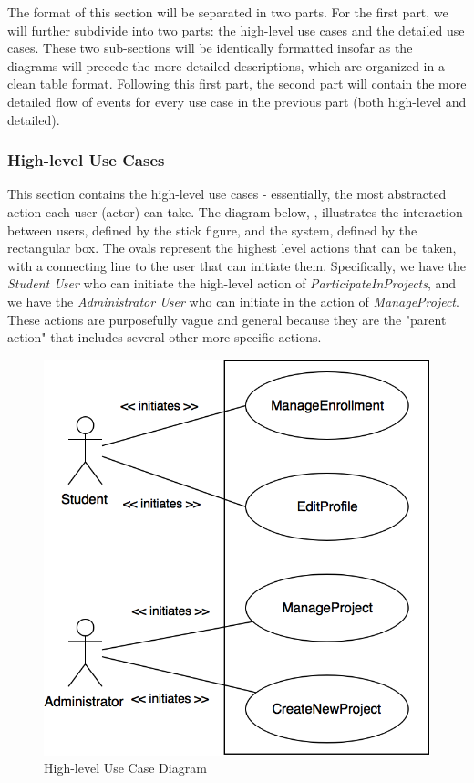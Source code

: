 \documentclass[12pt,letterpaper]{article}
\begin{document}
The format of this section will be separated in two parts. For the first part, we will further subdivide into two parts: the high-level use cases and the detailed use cases. 
These two sub-sections will be identically formatted insofar as the diagrams will precede the more detailed descriptions, which are organized in a clean table format. Following
this first part, the second part will contain the more detailed flow of events for every use case in the previous part (both high-level and detailed).

\subsubsection*{High-level Use Cases}

This section contains the high-level use cases - essentially, the most abstracted action each user (actor) can take. The diagram below, , illustrates the interaction between
users, defined by the stick figure, and the system, defined by the rectangular box. The ovals represent the highest level actions that can be taken, with a connecting line to
the user that can initiate them. Specifically, we have the {\it Student User} who can initiate the high-level action of {\it ParticipateInProjects}, and we have the {\it Administrator User} 
who can initiate in the action of {\it ManageProject}. These actions are purposefully vague and general because they are the "parent action" that includes several other more specific actions.
\vspace{1em}

\begin{figure}[H]
	\centering{}
	\includegraphics[scale=0.3]{imgs/high-level-use-case-diagram.png}
	\caption{High-level Use Case Diagram}
\end{figure}
\end{document}
